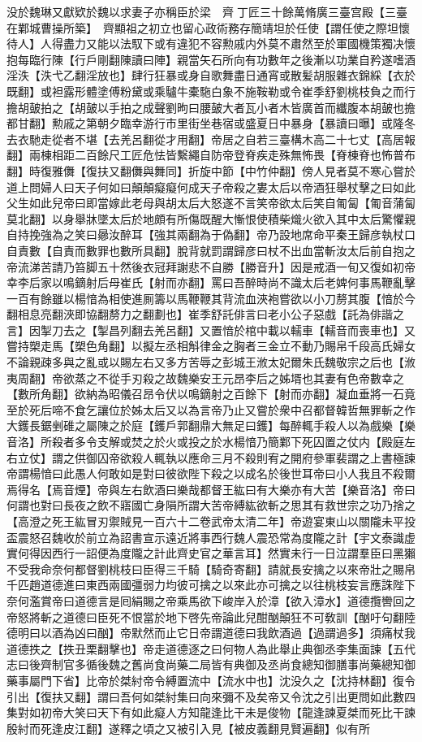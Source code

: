 没於魏琳又獻欵於魏以求妻子亦稱臣於梁　齊丁匠三十餘萬脩廣三臺宫殿【三臺在鄴城曹操所築】　齊顯祖之初立也留心政術務存簡靖坦於任使【謂任使之際坦懷待人】人得盡力又能以法馭下或有違犯不容勲戚内外莫不肅然至於軍國機策獨决懷抱每臨行陳【行戶剛翻陳讀曰陣】親當矢石所向有功數年之後漸以功業自矜遂嗜酒淫泆【泆弋乙翻淫放也】肆行狂暴或身自歌舞盡日通宵或散髪胡服雜衣錦綵【衣於既翻】或袒露形體塗傅粉黛或乘驢牛橐駞白象不施鞍勒或令崔季舒劉桃枝負之而行擔胡皷拍之【胡皷以手拍之成聲劉昫曰腰皷大者瓦小者木皆廣首而纖腹本胡皷也擔都甘翻】勲戚之第朝夕臨幸游行市里街坐巷宿或盛夏日中暴身【暴讀曰曝】或隆冬去衣馳走從者不堪【去羌呂翻從才用翻】帝居之自若三臺構木高二十七丈【高居報翻】兩棟相距二百餘尺工匠危怯皆繫繩自防帝登脊疾走殊無怖畏【脊棟脊也怖普布翻】時復雅儛【復扶又翻儛與舞同】折旋中節【中竹仲翻】傍人見者莫不寒心嘗於道上問婦人曰天子何如曰顛顛癡癡何成天子帝殺之婁太后以帝酒狂舉杖擊之曰如此父生如此兒帝曰即當嫁此老母與胡太后大怒遂不言笑帝欲太后笑自匍匐【匍音蒲匐莫北翻】以身舉牀墜太后於地頗有所傷既醒大慚恨使積柴熾火欲入其中太后驚懼親自持挽強為之笑曰曏汝醉耳【強其兩翻為于偽翻】帝乃設地席命平秦王歸彦執杖口自責數【自責而數罪也數所具翻】脫背就罰謂歸彦曰杖不出血當斬汝太后前自抱之帝流涕苦請乃笞脚五十然後衣冠拜謝悲不自勝【勝音升】因是戒酒一旬又復如初帝幸李后家以鳴鏑射后母崔氏【射而亦翻】罵曰吾醉時尚不識太后老婢何事馬鞭亂擊一百有餘雖以楊愔為相使進厠籌以馬鞭鞭其背流血浹袍嘗欲以小刀剺其腹【愔於今翻相息亮翻浹即協翻剺力之翻劃也】崔季舒託俳言曰老小公子惡戲【託為俳諧之言】因掣刀去之【掣昌列翻去羌呂翻】又置愔於棺中載以轜車【轜音而喪車也】又嘗持槊走馬【槊色角翻】以擬左丞相斛律金之胸者三金立不動乃賜帛千段高氏婦女不論親疎多與之亂或以賜左右又多方苦辱之彭城王浟太妃爾朱氏魏敬宗之后也【浟夷周翻】帝欲蒸之不從手刃殺之故魏樂安王元昂李后之姊壻也其妻有色帝數幸之【數所角翻】欲納為昭儀召昂令伏以鳴鏑射之百餘下【射而亦翻】凝血垂將一石竟至於死后啼不食乞讓位於姊太后又以為言帝乃止又嘗於衆中召都督韓哲無罪斬之作大鑊長鋸剉碓之屬陳之於庭【鑊戶郭翻鼎大無足曰鑊】每醉輒手殺人以為戲樂【樂音洛】所殺者多令支解或焚之於火或投之於水楊愔乃簡鄴下死囚置之仗内【殿庭左右立仗】謂之供御囚帝欲殺人輒執以應命三月不殺則宥之開府參軍裴謂之上書極諫帝謂楊愔曰此愚人何敢如是對曰彼欲陛下殺之以成名於後世耳帝曰小人我且不殺爾焉得名【焉音煙】帝與左右飲酒曰樂哉都督王紘曰有大樂亦有大苦【樂音洛】帝曰何謂也對曰長夜之飲不寤國亡身隕所謂大苦帝縛紘欲斬之思其有救世宗之功乃捨之【高澄之死王紘冒刃禦賊見一百六十二卷武帝太清二年】帝遊宴東山以關隴未平投盃震怒召魏收於前立為詔書宣示遠近將事西行魏人震恐常為度隴之計【宇文泰識虚實何得因西行一詔便為度隴之計此齊史官之華言耳】然實未行一日泣謂羣臣曰黑獺不受我命奈何都督劉桃枝曰臣得三千騎【騎奇寄翻】請就長安擒之以來帝壯之賜帛千匹趙道德進曰東西兩國彊弱力均彼可擒之以來此亦可擒之以往桃枝妄言應誅陛下奈何濫賞帝曰道德言是囘絹賜之帝乘馬欲下峻岸入於漳【欲入漳水】道德攬轡回之帝怒將斬之道德曰臣死不恨當於地下啓先帝論此兒酣酗顛狂不可敎訓【酗吁句翻陸德明曰以酒為凶曰酗】帝默然而止它日帝謂道德曰我飲酒過【過謂過多】須痛杖我道德抶之【抶丑栗翻擊也】帝走道德逐之曰何物人為此舉止典御丞李集面諫【五代志曰後齊制官多循後魏之舊尚食尚藥二局皆有典御及丞尚食總知御膳事尚藥總知御藥事屬門下省】比帝於桀紂帝令縛置流中【流水中也】沈没久之【沈持林翻】復令引出【復扶又翻】謂曰吾何如桀紂集曰向來彌不及矣帝又令沈之引出更問如此數四集對如初帝大笑曰天下有如此癡人方知龍逢比干未是俊物【龍逢諫夏桀而死比干諫殷紂而死逢皮江翻】遂釋之頃之又被引入見【被皮義翻見賢遍翻】似有所